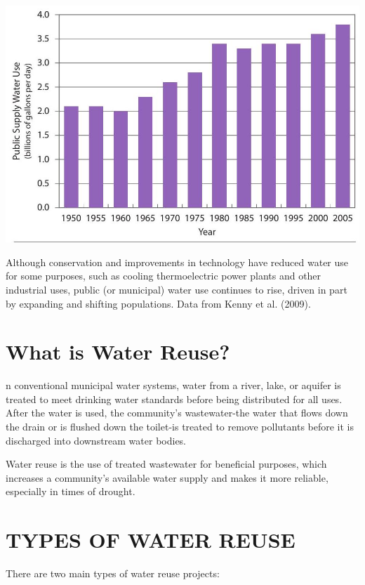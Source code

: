 \documentclass[10pt]{article}
\begin{document}
\includegraphics[max width=\textwidth]{2022_11_05_93277ca2de7ec5580550g-01(1)}

Although conservation and improvements in technology have reduced water use for some purposes, such as cooling thermoelectric power plants and other industrial uses, public (or municipal) water use continues to rise, driven in part by expanding and shifting populations. Data from Kenny et al. (2009).

\section{What is Water Reuse?}
n conventional municipal water systems, water from a river, lake, or aquifer is treated to meet drinking water standards before being distributed for all uses. After the water is used, the community's wastewater-the water that flows down the drain or is flushed down the toilet-is treated to remove pollutants before it is discharged into downstream water bodies.

Water reuse is the use of treated wastewater for beneficial purposes, which increases a community's available water supply and makes it more reliable, especially in times of drought.

\section{TYPES OF WATER REUSE}
There are two main types of water reuse projects:
\end{document}
